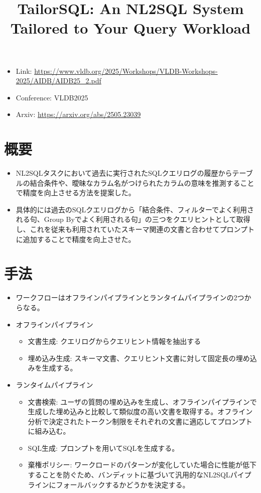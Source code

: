 \documentclass[dvipdfmx,uplatex]{jsarticle}
\title{TailorSQL: An NL2SQL System Tailored to Your Query Workload}
\author{\empty}
\date{\empty}
\theoremstyle{remark}
\newenvironment{simplebox}{
    \begin{tcolorbox}[
        fonttitle=\bfseries,
    ]
}{
    \end{tcolorbox}
}
\newenvironment{method}[1]{
    \begin{tcolorbox}[
        colframe=green!50!black,
        colback=green!50!black!10!white,
        colbacktitle=green!50!black!40!white,
        coltitle=black,
        fonttitle=\bfseries,
        title={#1}
    ]
}{
    \end{tcolorbox}
}
\begin{document}
\maketitle

\begin{itemize}
    \item Link: \url{https://www.vldb.org/2025/Workshops/VLDB-Workshops-2025/AIDB/AIDB25_2.pdf}
    \item Conference: VLDB2025
    \item Arxiv: \url{https://arxiv.org/abs/2505.23039}
\end{itemize}

\section{概要}
\begin{simplebox}
\begin{itemize}
    \item NL2SQLタスクにおいて過去に実行されたSQLクエリログの履歴からテーブルの結合条件や、曖昧なカラム名がつけられたカラムの意味を推測することで精度を向上させる方法を提案した。
    \item 具体的には過去のSQLクエリログから「結合条件、フィルターでよく利用される句、Group Byでよく利用される句」の三つをクエリヒントとして取得し、これを従来も利用されていたスキーマ関連の文書と合わせてプロンプトに追加することで精度を向上させた。
\end{itemize}
\end{simplebox}

\section{手法}
\begin{method}{全体ワークフロー}
\begin{itemize}
    \item ワークフローはオフラインパイプラインとランタイムパイプラインの2つからなる。
    \item オフラインパイプライン
    \begin{itemize}
        \item 文書生成: クエリログからクエリヒント情報を抽出する
        \item 埋め込み生成: スキーマ文書、クエリヒント文書に対して固定長の埋め込みを生成する。
    \end{itemize}
    \item ランタイムパイプライン
    \begin{itemize}
        \item 文書検索: ユーザの質問の埋め込みを生成し、オフラインパイプラインで生成した埋め込みと比較して類似度の高い文書を取得する。オフライン分析で決定されたトークン制限をそれぞれの文書に適応してプロンプトに組み込む。
        \item SQL生成: プロンプトを用いてSQLを生成する。
        \item 棄権ポリシー: ワークロードのパターンが変化していた場合に性能が低下することを防ぐため、バンディットに基づいて汎用的なNL2SQLパイプラインにフォールバックするかどうかを決定する。
    \end{itemize}
\end{itemize}
\end{method}
\end{document}

